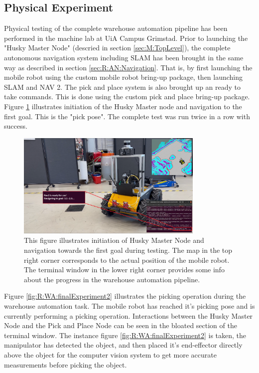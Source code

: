 \subsection{Physical Experiment}
Physical testing of the complete warehouse automation pipeline has been performed in the machine lab at UiA Campus Grimstad. Prior to launching the "Husky Master Node" (descried in section \ref{sec:M:TopLevel}), the complete autonomous navigation system including SLAM has been brought in the same way as described in section \ref{sec:R:AN:Navigation}. That is, by first launching the mobile robot using the custom mobile robot bring-up package, then launching SLAM and NAV 2. The pick and place system is also brought up an ready to take commands. This is done using the custom pick and place bring-up package. Figure \ref{fig:R:WA:finalExperiment1} illustrates initiation of the Husky Master node and navigation to the first goal. This is the "pick pose". The complete test was run twice in a row with success.

\begin{figure}[htp!]
  \centering
  \includegraphics[width = 0.8\textwidth]{Figures/figHuskyFinalExperiment1.png}
  \caption{This figure illustrates initiation of Husky Master Node and navigation towards the first goal during testing. The map in the top right corner corresponds to the actual position of the mobile robot. The terminal window in the lower right corner provides some info about the progress in the warehouse automation pipeline.}
  \label{fig:R:WA:finalExperiment1}
\end{figure}

Figure \ref{fig:R:WA:finalExperiment2} illustrates the picking operation during the warehouse automation task. The mobile robot has reached it's picking pose and is currently performing a picking operation. Interactions between the Husky Master Node and the Pick and Place Node can be seen in the bloated section of the terminal window. The instance figure \ref{fig:R:WA:finalExperiment2} is taken, the manipulator has detected the object, and then placed it's end-effector directly above the object for the computer vision system to get more accurate measurements before picking the object.

